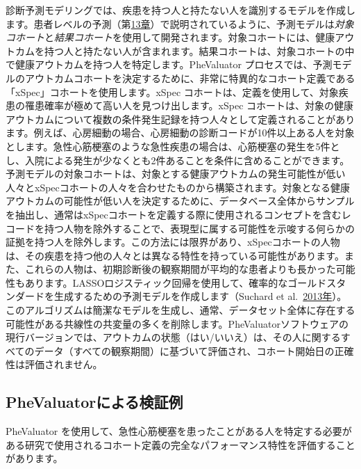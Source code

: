 \documentclass[
  11pt]{book}
\theoremstyle{definition}
\theoremstyle{definition}
\theoremstyle{definition}
\theoremstyle{definition}
\theoremstyle{remark}
\begin{document}
診断予測モデリングでは、疾患を持つ人と持たない人を識別するモデルを作成します。患者レベルの予測（第\href{https://ohdsi.github.io/TheBookOfOhdsi/PatientLevelPrediction.html\#PatientLevelPrediction}{13章}）で説明されているように、予測モデルは\emph{対象コホート}と\emph{結果コホート}を使用して開発されます。対象コホートには、健康アウトカムを持つ人と持たない人が含まれます。結果コホートは、対象コホートの中で健康アウトカムを持つ人を特定します。PheValuator プロセスでは、予測モデルのアウトカムコホートを決定するために、非常に特異的なコホート定義である「xSpec」コホートを使用します。xSpec コホートは、定義を使用して、対象疾患の罹患確率が極めて高い人を見つけ出します。xSpec コホートは、対象の健康アウトカムについて複数の条件発生記録を持つ人々として定義されることがあります。例えば、心房細動の場合、心房細動の診断コードが10件以上ある人を対象とします。急性心筋梗塞のような急性疾患の場合は、心筋梗塞の発生を5件とし、入院による発生が少なくとも2件あることを条件に含めることができます。予測モデルの対象コホートは、対象とする健康アウトカムの発生可能性が低い人々とxSpecコホートの人々を合わせたものから構築されます。対象となる健康アウトカムの可能性が低い人を決定するために、データベース全体からサンプルを抽出し、通常はxSpecコホートを定義する際に使用されるコンセプトを含むレコードを持つ人物を除外することで、表現型に属する可能性を示唆する何らかの証拠を持つ人を除外します。この方法には限界があり、xSpecコホートの人物は、その疾患を持つ他の人々とは異なる特性を持っている可能性があります。また、これらの人物は、初期診断後の観察期間が平均的な患者よりも長かった可能性もあります。LASSOロジスティック回帰を使用して、確率的なゴールドスタンダードを生成するための予測モデルを作成します（Suchard et al.~\href{https://ohdsi.github.io/TheBookOfOhdsi/ClinicalValidity.html\#ref-suchard_2013}{2013年}）。このアルゴリズムは簡潔なモデルを生成し、通常、データセット全体に存在する可能性がある共線性の共変量の多くを削除します。PheValuatorソフトウェアの現行バージョンでは、アウトカムの状態（はい/いいえ）は、その人に関するすべてのデータ（すべての観察期間）に基づいて評価され、コホート開始日の正確性は評価されません。

\subsection{PheValuatorによる検証例}\label{phevaluatorux306bux3088ux308bux691cux8a3cux4f8b}

PheValuator を使用して、急性心筋梗塞を患ったことがある人を特定する必要がある研究で使用されるコホート定義の完全なパフォーマンス特性を評価することがあります。
\end{document}
